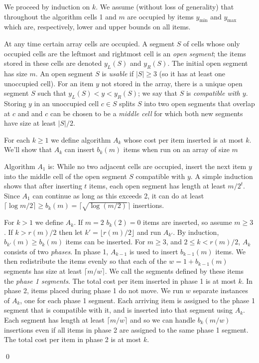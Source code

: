 \documentclass[unicode,review]{siamart1116}
\newenvironment{proofof}[1]{\noindent{\textbf { Proof of #1:}}} {{\qed}}
\numberwithin{theorem}{section}
\begin{document}
\begin{proofof}{\Cref{thm:ub}}
We proceed by induction on $k$. We assume (without loss of generality) that throughout the algorithm
cells 1 and $m$ are occupied by items $y_{\min}$ and $y_{\max}$ which are, respectively, lower and upper bounds
on all items.   

At any time certain array cells are occupied.   A segment $S$ of cells whose only occupied cells are the leftmost and rightmost cell is an {\em open segment};
the items stored in these cells
are denoted $y_L(S)$ and $y_R(S)$. The initial open segment has size $m$.  
An open segment $S$ is {\em usable} if $|S| \geq 3$ (so it has at least one unoccupied cell).
For an item $y$ not stored in the array, there is a unique open segment $S$ such that
$y_L(S)<y<y_R(S)$; we say that $S$ is  {\em compatible with $y$}.
Storing $y$ in an unoccupied cell  $c \in S$ splits $S$   into two open
segments that overlap at $c$ and
and $c$ can be chosen to be a {\em middle cell} for which both new segments have size at least $|S|/2$. 

\iffalse
 More generally, it can be checked that given $q-1$ items to be placed in an open
interval $S$ that has at least $q-1$ unoccupied spaces we can place them evenly so that each of the $q$
open segments produced has size at least $|S|/q$.  (The worst case is $|S|=aq+1)$ for some integer $a$, and
in this case each of the $q$ resulting subsegments has length $a+1 \geq |S|/q$.)
\fi


For each $k \geq 1$ we define algorithm $A_k$ whose cost per item
inserted is at most $k$.  We'll show that $A_k$ can insert $b_k(m)$ items when
run on an array of size $m$

 Algorithm $A_1$ is: While  no two adjacent cells are occupied, insert the next item $y$ into the middle cell of the
open segment $S$ compatible with $y$.
A simple induction shows that after inserting $t$ items, each open segment has length at least $m/2^t$. Since $A_1$ can continue as long as this exceeds 2, it can
do
at least $\lceil \log m/2 \rceil  \geq b_k(m)=\lceil \sqrt{\log (m/2)} \rceil $ insertions.


For $k>1$ we define $A_k$.  If  $m=2$   $b_k(2)=0$ items are inserted,
so assume $m \geq 3$.  If $k > r(m)/2$ then let $k'=\lfloor r(m)/2 \rfloor$ and run $A_{k'}$.
By induction, $b_{k'}(m) \geq b_k(m)$ items can be inserted.
For $m \geq 3$, and $2 \leq k < r(m)/2$, $A_k$ consists of two {\em phases}.  In phase 1,  $A_{k-1}$ is
used to insert $b_{k-1}(m)$ items.
We then redistribute the items evenly so that each of the $w=1+b_{k-1}(m)$ segments has size
at least $\lceil m/w \rceil$.  
We call the segments defined by these items the {\em phase 1 segments}.   
The total cost per item inserted in phase 1  is at most $k$.
In phase 2, items placed during phase 1 do not move. 
We run $w$ separate instances of $A_k$, one for each  phase 1 segment. Each arriving item is assigned to the phase 1 segment that is compatible with it,
and is inserted into that segment using $A_k$.  Each segment has length at least $\lceil m/w \rceil $ and so we can handle $b_k(m/w)$ insertions 
even if all items in phase 2 are assigned to the same phase 1 segment. The total
cost per item in phase 2 is at most $k$.


\end{proofof}
\end{document}
